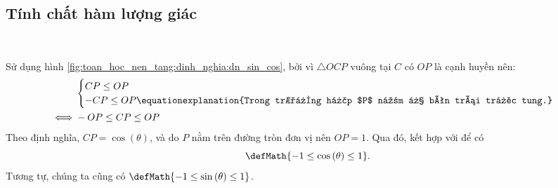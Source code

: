 \subsection{Tính chất hàm lượng giác}

\ %

Sử dụng hình \ref{fig:toan_hoc_nen_tang:dinh_nghia:dn_sin_cos}, bởi vì $\triangle OCP$ vuông tại $C$ có $OP$ là cạnh huyền nên:
\begin{align}
   &\begin{cases}
      CP \leq OP \\
      -CP \leq OP \equationexplanation{Trong trường hợp $P$ nằm ở bên trái trục tung.}
   \end{cases} \nonumber\\
   \iff &-OP \leq CP \leq OP \label{eq:toan_hoc_nen_tang:ham_luong_giac:dinh_nghia:dn_sin_cos}
\end{align}
Theo định nghĩa, $CP = \cos \left(\theta\right)$, và do $P$ nằm trên đường tròn đơn vị nên $OP = 1$. Qua đó, kết hợp với  để có
\begin{equation*}
   \defMath{-1 \leq \cos \left(\theta\right) \leq 1}.
\end{equation*}
Tương tự, chúng ta cũng có $\defMath{-1 \leq \sin \left(\theta\right) \leq 1}$.

